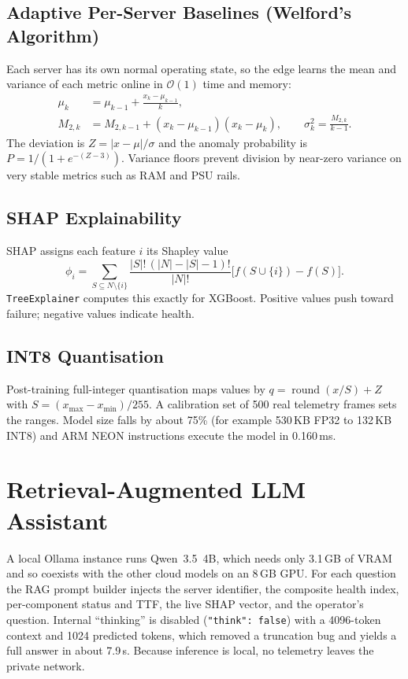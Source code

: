 \documentclass[12pt,a4paper]{report}
\begin{document}
\subsection{Adaptive Per-Server Baselines (Welford's Algorithm)}
Each server has its own normal operating state, so the edge learns the mean and variance of each metric online in $\mathcal O(1)$ time and memory:
\begin{align}
  \mu_k &= \mu_{k-1}+\frac{x_k-\mu_{k-1}}{k},\\
  M_{2,k} &= M_{2,k-1}+(x_k-\mu_{k-1})(x_k-\mu_k),\qquad \sigma_k^2=\frac{M_{2,k}}{k-1}.
\end{align}
The deviation is $Z=|x-\mu|/\sigma$ and the anomaly probability is $P=1/(1+e^{-(Z-3)})$. Variance floors prevent division by near-zero variance on very stable metrics such as RAM and PSU rails.

\subsection{SHAP Explainability}
SHAP assigns each feature $i$ its Shapley value
\begin{equation}
  \phi_i=\sum_{S\subseteq N\setminus\{i\}}\frac{|S|!\,(|N|-|S|-1)!}{|N|!}\big[f(S\cup\{i\})-f(S)\big].
\end{equation}
\texttt{TreeExplainer} computes this exactly for XGBoost. Positive values push toward failure; negative values indicate health.

\subsection{INT8 Quantisation}
Post-training full-integer quantisation maps values by $q=\operatorname{round}(x/S)+Z$ with $S=(x_{\max}-x_{\min})/255$. A calibration set of 500 real telemetry frames sets the ranges. Model size falls by about 75\% (for example 530\,KB FP32 to 132\,KB INT8) and ARM NEON instructions execute the model in 0.160\,ms.

\section{Retrieval-Augmented LLM Assistant}
A local Ollama instance runs Qwen~3.5~4B, which needs only 3.1\,GB of VRAM and so coexists with the other cloud models on an 8\,GB GPU. For each question the RAG prompt builder injects the server identifier, the composite health index, per-component status and TTF, the live SHAP vector, and the operator's question. Internal ``thinking'' is disabled (\texttt{"think": false}) with a 4096-token context and 1024 predicted tokens, which removed a truncation bug and yields a full answer in about 7.9\,s. Because inference is local, no telemetry leaves the private network.
\end{document}
